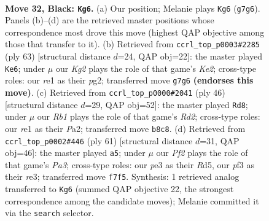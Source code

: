 \documentclass[11pt]{article}
\begin{document}
\clearpage

\begin{figure}[p]\centering
\begin{subfigure}{0.46\textwidth}\centering
\resizebox{\linewidth}{!}{%
\newchessgame
\chessboard[
  setfen={1r6/1p3pk1/p3p3/8/7p/4PP2/PR4PP/4R1K1 b - - 0 32},
  showmover=false,
  pgfstyle=straightmove, color=movearrow, markmove={g7-g6}
]}
\caption{}
\end{subfigure}\hfill
\begin{subfigure}{0.46\textwidth}\centering
\resizebox{\linewidth}{!}{%
\newchessgame
\chessboard[
  setfen={2r5/4kpp1/7p/p1p5/P3P2P/1PR2K2/6P1/8 b - - 2 32},
  showmover=false,
  pgfstyle=straightmove, color=movearrow, markmove={e7-e6}
]}
\caption{}
\end{subfigure}
\\[4pt]
\begin{subfigure}{0.46\textwidth}\centering
\resizebox{\linewidth}{!}{%
\newchessgame
\chessboard[
  setfen={8/ppr1ppkp/6p1/8/8/1P3P2/P1PR2PP/2K5 w - - 0 24},
  showmover=false,
  pgfstyle=straightmove, color=movearrow, markmove={d2-d8}
]}
\caption{}
\end{subfigure}\hfill
\begin{subfigure}{0.46\textwidth}\centering
\resizebox{\linewidth}{!}{%
\newchessgame
\chessboard[
  setfen={5k2/3r1p1p/p5p1/3r4/8/1P2R1P1/P4RKP/8 b - - 1 31},
  showmover=false,
  pgfstyle=straightmove, color=movearrow, markmove={a6-a5}
]}
\caption{}
\end{subfigure}
\caption{\textbf{Move 32, Black: \texttt{Kg6}.} (a) Our position; Melanie plays \texttt{Kg6} (\texttt{g7g6}). Panels (b)--(d) are the retrieved master positions whose correspondence most drove this move (highest QAP objective among those that transfer to it). (b) Retrieved from \texttt{ccrl\_top\_p0003\#2285} (ply 63) [structural distance $d$=24, QAP obj=22]: the master played \texttt{Ke6}; under $\mu$ our \emph{Kg2} plays the role of that game's \emph{Ke2}; cross-type roles: our \emph{r}e1 as their \emph{p}g2; transferred move \texttt{g7g6} \textbf{(endorses this move)}. (c) Retrieved from \texttt{ccrl\_top\_p0000\#2041} (ply 46) [structural distance $d$=29, QAP obj=52]: the master played \texttt{Rd8}; under $\mu$ our \emph{Rb1} plays the role of that game's \emph{Rd2}; cross-type roles: our \emph{r}e1 as their \emph{P}a2; transferred move \texttt{b8c8}. (d) Retrieved from \texttt{ccrl\_top\_p0002\#446} (ply 61) [structural distance $d$=31, QAP obj=46]: the master played \texttt{a5}; under $\mu$ our \emph{Pf2} plays the role of that game's \emph{Pa3}; cross-type roles: our \emph{p}e3 as their \emph{R}d5, our \emph{p}f3 as their \emph{r}e3; transferred move \texttt{f7f5}. Synthesis: 1 retrieved analog transferred to \texttt{Kg6} (summed QAP objective 22, the strongest correspondence among the candidate moves); Melanie committed it via the \texttt{search} selector.}
\label{fig:thought-m63}
\end{figure}
\end{document}
